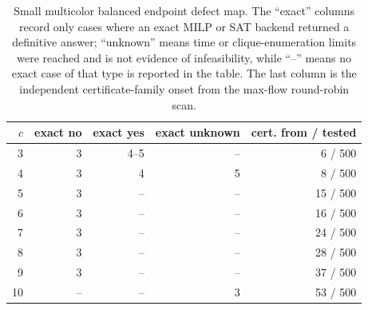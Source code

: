 \documentclass[11pt]{article}
\theoremstyle{plain}
\theoremstyle{definition}
\theoremstyle{remark}
\begin{document}
\begin{table}[htbp]
\centering
\caption{Small multicolor balanced endpoint defect map.  The ``exact''
columns record only cases where an exact MILP or SAT backend returned a
definitive answer; ``unknown'' means time or clique-enumeration limits were
reached and is not evidence of infeasibility, while ``--'' means no exact
case of that type is reported in the table.  The last column is the
independent certificate-family onset from the max-flow round-robin scan.}
\label{tab:balanced-multicolor-defect-map}
\small
\begin{tabular}{@{}rrrrr@{}}
\toprule
$c$ & exact no & exact yes & exact unknown & cert. from / tested \\
\midrule
3 & 3 & 4--5 & -- & 6 / 500 \\
4 & 3 & 4 & 5 & 8 / 500 \\
5 & 3 & -- & -- & 15 / 500 \\
6 & 3 & -- & -- & 16 / 500 \\
7 & 3 & -- & -- & 24 / 500 \\
8 & 3 & -- & -- & 28 / 500 \\
9 & 3 & -- & -- & 37 / 500 \\
10 & -- & -- & 3 & 53 / 500 \\
\bottomrule
\end{tabular}

\end{table}
\end{document}
